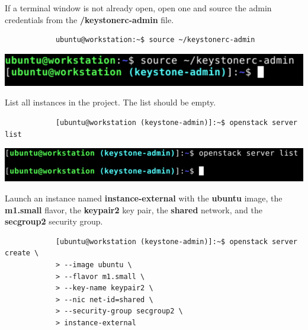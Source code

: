 \documentclass[letterpaper, 12pt]{article}
\begin{document}
\begin{enumerate}
    \begin{labstep}
        If a terminal window is not already open, open one and source the admin credentials from the \textbf{\texttildemid/keystonerc-admin} file.
        \begin{lstlisting}
            ubuntu@workstation:~$ source ~/keystonerc-admin
        \end{lstlisting}

        \begin{center}
            \includegraphics[width=\linewidth]{images/part6/step1.png}
        \end{center}
    \end{labstep}

    \begin{labstep}
        List all instances in the project.
        The list should be empty.
        \begin{lstlisting}
            [ubuntu@workstation (keystone-admin)]:~$ openstack server list
        \end{lstlisting}

        \begin{center}
            \includegraphics[width=\linewidth]{images/part6/step2.png}
        \end{center}
    \end{labstep}

    \begin{labstep}
        Launch an instance named \textbf{instance-external} with the \textbf{ubuntu} image, the \textbf{m1.small} flavor, the \textbf{keypair2} key pair, the \textbf{shared} network, and the \textbf{secgroup2} security group.
        \begin{lstlisting}
            [ubuntu@workstation (keystone-admin)]:~$ openstack server create \
            > --image ubuntu \
            > --flavor m1.small \
            > --key-name keypair2 \
            > --nic net-id=shared \
            > --security-group secgroup2 \
            > instance-external
        \end{lstlisting}


\end{labstep}
\end{enumerate}
\end{document}
